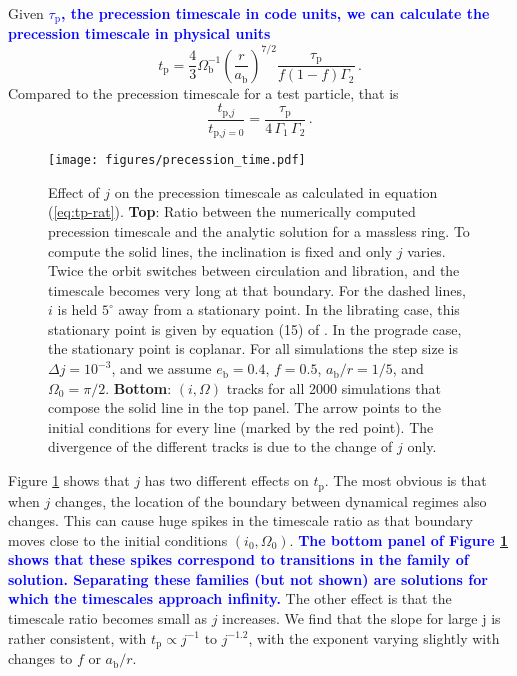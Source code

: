 \documentclass[twocolumn,linenumbers]{aastex631}
\newcommand{\RR}[1]{\textcolor{blue}{\bf#1}} %
\begin{document}
Given \RR{$\tau_\text{p}$, the precession timescale in code units, we can calculate the precession timescale in physical units}
\begin{equation}
    \label{eq:tp-j}
    t_\text{p} = \frac{4}{3}\Omega_\text{b}^{-1} \left(\frac{r}{a_\text{b}}\right)^{7/2} \frac{\tau_\text{p}}{f(1-f)\Gamma_2}\, .
\end{equation}
Compared to the precession timescale for a test particle, that is
\begin{equation}
    \label{eq:tp-rat}
    \frac{t_{\text{p,}j}}{t_{\text{p,}j=0}} = \frac{\tau_\text{p}}{4\,\Gamma_1\,\Gamma_2} \, .
\end{equation}

\begin{figure}
    \texttt{[image: figures/precession\_time.pdf]}
    \caption{
        Effect of $j$ on the precession timescale as calculated in equation (\ref{eq:tp-rat}). {\bf Top}: Ratio between the numerically computed precession timescale and the analytic solution for a massless ring. To compute the solid lines, the inclination is fixed and only $j$ varies. Twice the orbit switches between circulation and libration, and the timescale becomes very long at that boundary. For the dashed lines, $i$ is held $5^\circ$ away from a stationary point. In the librating case, this stationary point is given by equation (15) of \citet{martin2019}. In the prograde case, the stationary point is coplanar. For all simulations the step size is $\Delta j = 10^{-3}$, and we assume $e_\text{b}=0.4$, $f=0.5$, $a_\text{b}/r = 1/5$, and $\Omega_0 = \pi/2$. {\bf Bottom}: $(i,\Omega)$ tracks for all 2000 simulations that compose the solid line in the top panel. The arrow points to the initial conditions for every line (marked by the red point). The divergence of the different tracks is due to the change of $j$ only.
    }
    \label{fig:t_p}
\end{figure}

Figure \ref{fig:t_p} shows that $j$ has two different effects on $t_\text{p}$. The most obvious is that when $j$ changes, the location of the boundary between dynamical regimes also changes. This can cause huge spikes in the timescale ratio as that boundary moves close to the initial conditions $(i_0, \Omega_0)$. \RR{The bottom panel of Figure \ref{fig:t_p} shows that these spikes correspond to transitions in the family of solution. Separating these families (but not shown) are solutions for which the timescales approach infinity.}
The other effect is that the timescale ratio becomes small as $j$ increases. We find that the slope for large j is rather consistent, with $t_\text{p}\propto j^{-1} \text{ to } j^{-1.2}$, with the exponent varying slightly with changes to $f$ or $a_\text{b}/r$. 
\end{document}

